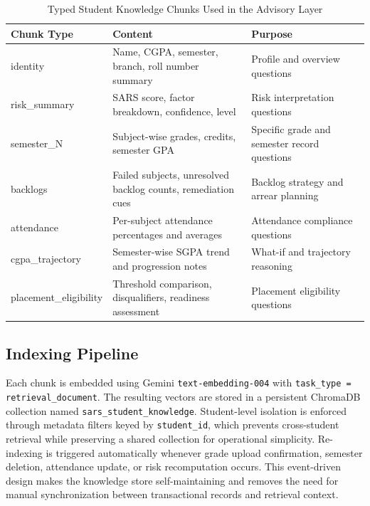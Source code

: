 \documentclass[conference]{IEEEtran}
\begin{document}
\begin{table}[t]
\caption{Typed Student Knowledge Chunks Used in the Advisory Layer}
\label{tab:chunks}
\centering
\begin{tabular}{lll}
\toprule
Chunk Type & Content & Purpose \\
\midrule
identity & Name, CGPA, semester, branch, roll number summary & Profile and overview questions \\
risk\_summary & SARS score, factor breakdown, confidence, level & Risk interpretation questions \\
semester\_N & Subject-wise grades, credits, semester GPA & Specific grade and semester record questions \\
backlogs & Failed subjects, unresolved backlog counts, remediation cues & Backlog strategy and arrear planning \\
attendance & Per-subject attendance percentages and averages & Attendance compliance questions \\
cgpa\_trajectory & Semester-wise SGPA trend and progression notes & What-if and trajectory reasoning \\
placement\_eligibility & Threshold comparison, disqualifiers, readiness assessment & Placement eligibility questions \\
\bottomrule
\end{tabular}
\end{table}

\subsection{Indexing Pipeline}
Each chunk is embedded using Gemini \texttt{text-embedding-004} with \texttt{task\_type = retrieval\_document}. The resulting vectors are stored in a persistent ChromaDB collection named \texttt{sars\_student\_knowledge}. Student-level isolation is enforced through metadata filters keyed by \texttt{student\_id}, which prevents cross-student retrieval while preserving a shared collection for operational simplicity. Re-indexing is triggered automatically whenever grade upload confirmation, semester deletion, attendance update, or risk recomputation occurs. This event-driven design makes the knowledge store self-maintaining and removes the need for manual synchronization between transactional records and retrieval context.
\end{document}
